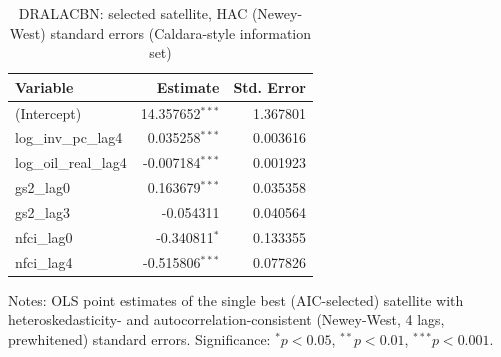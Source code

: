 \begin{table}[!htbp]
\centering
\caption{DRALACBN: selected satellite, HAC (Newey-West) standard errors (Caldara-style information set)}
\label{tab:dralacbn_caldara_style_satellite_hac}
\begin{tabular}{lrr}
\toprule
Variable & Estimate & Std. Error \\
\midrule
(Intercept) & 14.357652$^{***}$ & 1.367801 \\
log_inv_pc_lag4 & 0.035258$^{***}$ & 0.003616 \\
log_oil_real_lag4 & -0.007184$^{***}$ & 0.001923 \\
gs2_lag0 & 0.163679$^{***}$ & 0.035358 \\
gs2_lag3 & -0.054311 & 0.040564 \\
nfci_lag0 & -0.340811$^{*}$ & 0.133355 \\
nfci_lag4 & -0.515806$^{***}$ & 0.077826 \\
\bottomrule
\end{tabular}
\begin{tablenotes}
\small
\item Notes: OLS point estimates of the single best (AIC-selected) satellite with heteroskedasticity- and autocorrelation-consistent (Newey-West, 4 lags, prewhitened) standard errors. Significance: $^{*}p<0.05$, $^{**}p<0.01$, $^{***}p<0.001$.
\end{tablenotes}
\end{table}
